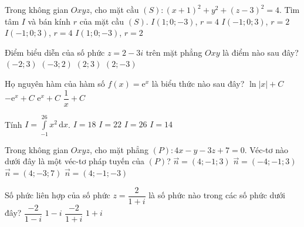 \begin{ex}%
	Trong không gian $ Oxyz $, cho mặt cầu $ (S)\colon (x+1)^2+y^2+(z-3)^2=4 $. Tìm tâm $ I $ và bán kính $ r $ của mặt cầu $ (S) $.
	\choice
	{$ I(1;0;-3) $, $ r=4 $}
	{\True $ I(-1;0;3) $, $ r=2 $}
	{$ I(-1;0;3) $, $ r=4 $}
	{$ I(1;0;-3) $, $ r=2 $}
\end{ex}
\begin{ex}%
	Điểm biểu diễn của số phức $ z=2-3i $ trên mặt phẳng $ Oxy $ là điểm nào sau đây?
	\choice
	{$ (-2;3) $}
	{$ (-3;2) $}
	{$ (2;3) $}
	{\True $ (2;-3) $}
\end{ex}
\begin{ex}%
	Họ nguyên hàm của hàm số $ f(x)=\mathrm{e}^x $ là biểu thức nào sau đây?
	\choice
	{$ \ln|x|+C $}
	{$ -\mathrm{e}^x+C $}
	{\True$ \mathrm{e}^x+C $}
	{$ \dfrac{1}{x}+C $}
\end{ex}
\begin{ex}%
	Tính $ I=\displaystyle\int\limits_{-1}^26x^2\mathrm{\,d}x $.
	\choice
	{\True$ I=18 $}
	{$ I=22 $}
	{$ I=26 $}
	{$ I=14 $}
\end{ex}
\begin{ex}%
	Trong không gian $ Oxyz $, cho mặt phẳng $ (P)\colon 4x-y-3z+7=0 $. Véc-tơ nào dưới đây là một véc-tơ pháp tuyến của $ (P) $?
	\choice
	{$ \vec{n}=(4;-1;3) $}
	{$ \vec{n}=(-4;-1;3) $}
	{$ \vec{n}=(4;-3;7) $}
	{\True $ \vec{n}=(4;-1;-3) $}
\end{ex}
\begin{ex}%
	Số phức liên hợp của số phức $ z=\dfrac{2}{1+i} $ là số phức nào trong các số phức dưới đây?
	\choice
	{$ \dfrac{-2}{1-i} $}
	{$ 1-i $}
	{$ \dfrac{-2}{1+i} $}
	{\True $ 1+i $}
\end{ex}

